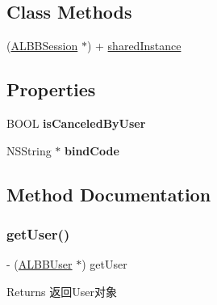 \subsection*{Class Methods}
\begin{DoxyCompactItemize}
\item 
(\mbox{\hyperlink{interface_a_l_b_b_session}{A\+L\+B\+B\+Session}} $\ast$) + \mbox{\hyperlink{interface_a_l_b_b_session_a766474152f755bb796925950fe2f11ce}{shared\+Instance}}
\end{DoxyCompactItemize}
\subsection*{Properties}
\begin{DoxyCompactItemize}
\item 
\mbox{\label{interface_a_l_b_b_session_af7e16ca00207b5b430e0f1709a0768a4}} 
B\+O\+OL {\bfseries is\+Canceled\+By\+User}
\item 
\mbox{\label{interface_a_l_b_b_session_aa0c5d7f83df3c3a1fa63276f7fec3ca2}} 
N\+S\+String $\ast$ {\bfseries bind\+Code}
\end{DoxyCompactItemize}


\subsection{Method Documentation}
\mbox{\label{interface_a_l_b_b_session_a199837d5253b40e16e5d522cd779e2dd}} 
\subsubsection{\texorpdfstring{get\+User()}{getUser()}}
{\footnotesize\ttfamily -\/ (\mbox{\hyperlink{interface_a_l_b_b_user}{A\+L\+B\+B\+User}} $\ast$) get\+User \begin{DoxyParamCaption}{ }\end{DoxyParamCaption}}

\begin{DoxyReturn}{Returns}
返回\+User对象 
\end{DoxyReturn}
\mbox{\label{interface_a_l_b_b_session_a501bd49a703cf9d0f41f9533ae661af3}} 
